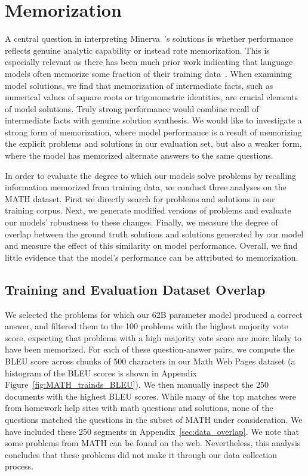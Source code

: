 \documentclass{article}
\newcommand{\ourmodel}[0]{{Minerva~}}
\begin{document}
\section{Memorization}
\label{sec:memorization}
A central question in interpreting \ourmodel\!\!'s solutions is whether performance reflects genuine analytic capability or instead rote memorization. This is especially relevant as there has been much prior work indicating that language models often memorize some fraction of their training data~\citep{trinh2018simple, radford2019language, carlini_memorization_22}.
When examining model solutions, we find that memorization of intermediate facts, such as numerical values of square roots or trigonometric identities, are crucial elements of model solutions.
Truly strong performance would combine recall of intermediate facts with genuine solution synthesis. 
We would like to investigate a strong form of memorization, where model performance is a result of memorizing the explicit problems and solutions in our evaluation set,
but also a weaker form, where the model has memorized alternate answers to the same questions.

In order to evaluate the degree to which our models solve problems by recalling information memorized from training data, we conduct three analyses on the MATH dataset.
First we directly search for problems and solutions in our training corpus.
Next, we generate modified versions of problems and evaluate our models' robustness to these changes.
Finally, we measure the degree of overlap between the ground truth solutions and solutions generated by our model and measure the effect of this similarity on model performance. Overall, we find little evidence that the model's performance can be attributed to memorization.

\subsection{Training and Evaluation Dataset Overlap}

We selected the problems for which our 62B parameter model produced a correct answer, and filtered them to the 100 problems with the highest majority vote score, expecting that problems with a high majority vote score are more likely to have been memorized. For each of these question-answer pairs, we compute the BLEU score across chunks of 500 characters in our Math Web Pages dataset (a histogram of the BLEU scores is shown in Appendix Figure~\ref{fig:MATH_trainds_BLEU}).
We then manually inspect the 250 documents with the highest BLEU scores. While many of the top matches were from homework help sites with math questions and solutions, none of the questions matched the questions in the subset of MATH under consideration.
We have included these 250 segments in Appendix~\ref{sec:data_overlap}.
We note that some problems from MATH can be found on the web.
Nevertheless, this analysis concludes that these problems did not make it through our data collection process.
\end{document}

